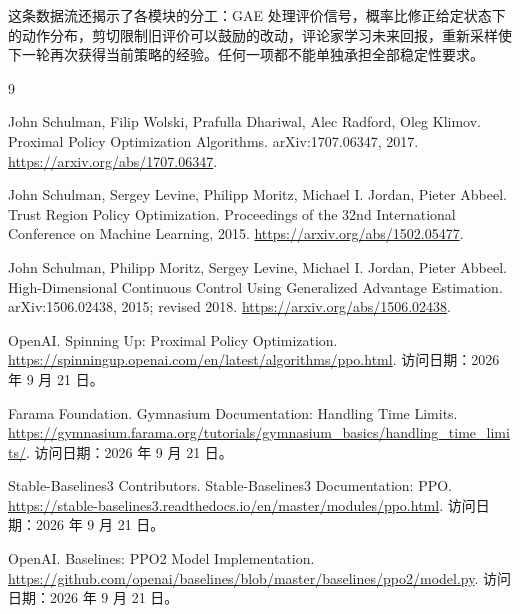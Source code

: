 \documentclass[UTF8]{ctexart}
\begin{document}
这条数据流还揭示了各模块的分工：GAE 处理评价信号，概率比修正给定状态下的动作分布，剪切限制旧评价可以鼓励的改动，评论家学习未来回报，重新采样使下一轮再次获得当前策略的经验。任何一项都不能单独承担全部稳定性要求。

\begin{thebibliography}{9}

John Schulman, Filip Wolski, Prafulla Dhariwal, Alec Radford, Oleg Klimov.
\newblock Proximal Policy Optimization Algorithms.
\newblock arXiv:1707.06347, 2017.
\newblock \url{https://arxiv.org/abs/1707.06347}.

John Schulman, Sergey Levine, Philipp Moritz, Michael I. Jordan, Pieter Abbeel.
\newblock Trust Region Policy Optimization.
\newblock Proceedings of the 32nd International Conference on Machine Learning, 2015.
\newblock \url{https://arxiv.org/abs/1502.05477}.

John Schulman, Philipp Moritz, Sergey Levine, Michael I. Jordan, Pieter Abbeel.
\newblock High-Dimensional Continuous Control Using Generalized Advantage Estimation.
\newblock arXiv:1506.02438, 2015; revised 2018.
\newblock \url{https://arxiv.org/abs/1506.02438}.

OpenAI.
\newblock Spinning Up: Proximal Policy Optimization.
\newblock \url{https://spinningup.openai.com/en/latest/algorithms/ppo.html}.
\newblock 访问日期：2026 年 9 月 21 日。

Farama Foundation.
\newblock Gymnasium Documentation: Handling Time Limits.
\newblock \url{https://gymnasium.farama.org/tutorials/gymnasium_basics/handling_time_limits/}.
\newblock 访问日期：2026 年 9 月 21 日。

Stable-Baselines3 Contributors.
\newblock Stable-Baselines3 Documentation: PPO.
\newblock \url{https://stable-baselines3.readthedocs.io/en/master/modules/ppo.html}.
\newblock 访问日期：2026 年 9 月 21 日。

OpenAI.
\newblock Baselines: PPO2 Model Implementation.
\newblock \url{https://github.com/openai/baselines/blob/master/baselines/ppo2/model.py}.
\newblock 访问日期：2026 年 9 月 21 日。

\end{thebibliography}
\end{document}
